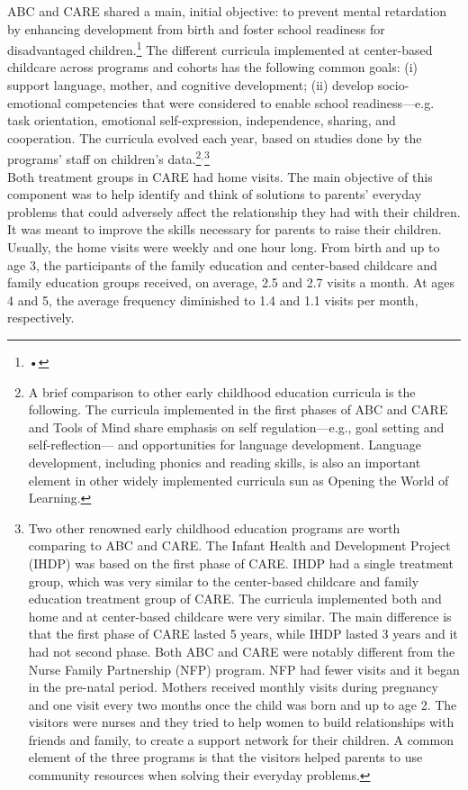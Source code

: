 \noindent ABC and CARE shared a main, initial objective: to prevent mental retardation by enhancing development from birth and foster school readiness for disadvantaged children.\footnote{•} The different curricula implemented at center-based childcare across programs and cohorts has the following common goals: (i) support language, mother, and cognitive development; (ii) develop socio-emotional competencies that were considered to enable school readiness---e.g. task orientation, emotional self-expression, independence, sharing, and cooperation. The curricula evolved each year, based on studies done by the programs' staff on children's data.\footnote{A brief comparison to other early childhood education curricula is the following. The curricula implemented in the first phases of ABC and CARE and Tools of Mind share emphasis on self regulation---e.g., goal setting and self-reflection--- and opportunities for language development. Language development, including phonics and reading skills, is also an important element in other widely implemented curricula sun as Opening the World of Learning.}${^{\text{,}}}$\footnote{Two other renowned early childhood education programs are worth comparing to ABC and CARE. The Infant Health and Development Project (IHDP) was based on the first phase of CARE. IHDP had a single treatment group, which was very similar to the center-based childcare and family education treatment group of CARE. The curricula implemented both and home and at center-based childcare were very similar. The main difference is that the first phase of CARE lasted 5 years, while IHDP lasted 3 years and it had not second phase. Both ABC and CARE were notably different from the Nurse Family Partnership (NFP) program. NFP had fewer visits and it began in the pre-natal period. Mothers received monthly visits during pregnancy and one visit every two months once the child was born and up to age 2. The visitors were nurses and they tried to help women to build relationships with friends and family, to create a support network for their children. A common element of the three programs is that the visitors helped parents to use community resources when solving their everyday problems.}\\

\noindent Both treatment groups in CARE had home visits. The main objective of this component was to help identify and think of solutions to parents' everyday problems that could adversely affect the relationship they had with their children. It was meant to improve the skills necessary for parents to raise their children. Usually, the home visits were weekly and one hour long. From birth and up to age 3, the participants of the family education and center-based childcare and family education groups received, on average, 2.5 and 2.7  visits a month. At ages 4 and 5, the average frequency diminished to 1.4 and 1.1 visits per month, respectively.\\ 

